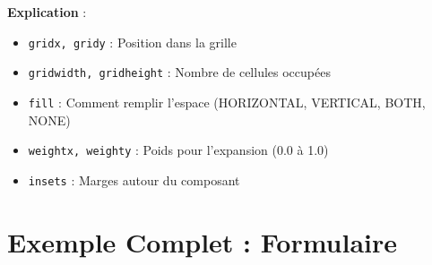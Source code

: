 \documentclass[11pt,a4paper]{article}
\begin{document}
\textbf{Explication} :
\begin{itemize}
    \item \texttt{gridx, gridy} : Position dans la grille
    \item \texttt{gridwidth, gridheight} : Nombre de cellules occupées
    \item \texttt{fill} : Comment remplir l'espace (HORIZONTAL, VERTICAL, BOTH, NONE)
    \item \texttt{weightx, weighty} : Poids pour l'expansion (0.0 à 1.0)
    \item \texttt{insets} : Marges autour du composant
\end{itemize}

\newpage

\section{Exemple Complet : Formulaire}
\end{document}

